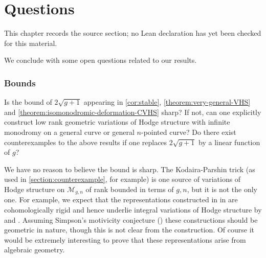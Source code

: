 \chapter{Questions}
\label{geometric-local-systems-general-curves-isomonodromy-chapter-08}

\begin{remark}
\label{geometric-local-systems-general-curves-isomonodromy-chapter-08-source}
This chapter records the source section; no Lean declaration has yet been checked for this material.
\notready
\end{remark}

\label{section:questions}

We conclude with some open questions related to our results.
\subsection{Bounds}

\begin{question}
\notready\label{question:bounds}
Is the bound of $2\sqrt{g+1}$ appearing in \autoref{cor:stable},
\autoref{theorem:very-general-VHS} and
\autoref{theorem:isomonodromic-deformation-CVHS} sharp? If not, can one
explicitly construct low rank geometric variations of Hodge structure with
infinite monodromy on a general curve or general $n$-pointed curve?
Do there exist counterexamples to the above results if one replaces $2
\sqrt{g+1}$ by a linear function of $g$?
\end{question}
We have no reason to believe the bound is sharp. The Kodaira-Parshin trick (as
used in \autoref{section:counterexample}, for example) is one source of
variations of Hodge structure on $\mathscr{M}_{g,n}$ of rank bounded in terms of
$g, n$, but it is not the only one. For example, we expect that the representations constructed in
in \cite{koberda2016quotients} are cohomologically rigid and hence underlie
integral variations of Hodge structure by \cite[Theorem
1.1]{esnault2018cohomologically} and \cite[Theorem 3]{simpson1992higgs}.
Assuming Simpson's motivicity conjecture (\cite[Conjecture,
p.~9]{simpson1992higgs}) these constructions should be geometric in nature, though this is not clear from the construction. Of course it would be extremely interesting to prove that these representations arise from algebraic geometry.


